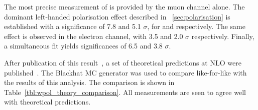 The most precise measurement of \fLmfR is provided by the muon channel
alone. The dominant left-handed polarisation effect described in
\sec~\ref{sec:polarisation} is established with a significance of 7.8 and 5.1
$\sigma$, for \PWp and \PWm respectively. The same effect is observed in the
electron channel, with 3.5 and 2.0 $\sigma$ respectively. Finally, a
simultaneous fit yields significances of 6.5 and 3.8 $\sigma$.

After publication of this result~\cite{cms_wpol_paper}, a set of theoretical
predictions at \ac{NLO} were published~\cite{berger_left_handed_w}. The Blackhat
\ac{MC} generator was used to compare like-for-like with the results of this
analysis. The comparison is shown in Table~\ref{tbl:wpol_theory_comparison}. All
measurements are seen to agree well with theoretical predictions.

